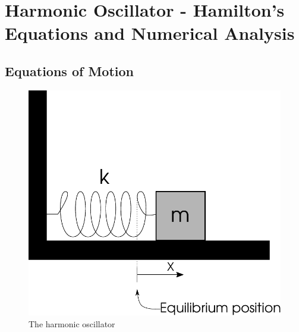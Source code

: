 \chapter{Harmonic Oscillator - Hamilton's Equations and Numerical Analysis}

\section{Equations of Motion}
\begin{figure}[ht!]
\centering 
\includegraphics[scale=0.7]{fig/harmonic_oscillator.pdf}
\caption{The harmonic oscillator}
\label{fig:ho}
\end{figure}
